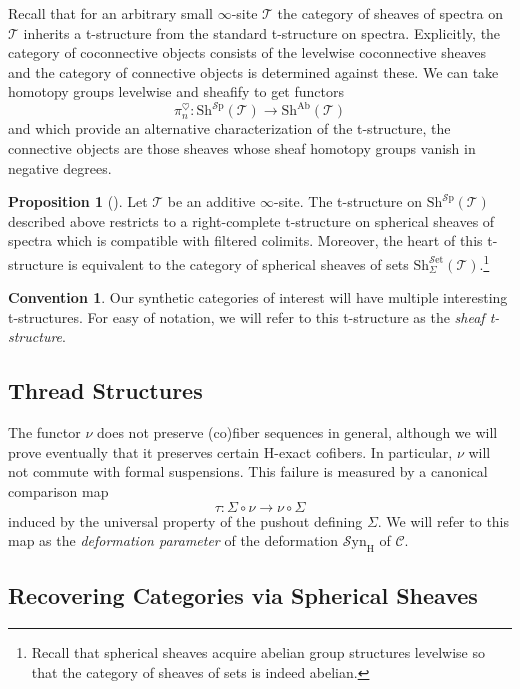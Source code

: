 \documentclass[10pt]{amsart}
\theoremstyle{definition}
\numberwithin{figure}{section}
\numberwithin{equation}{section}
\newtheorem{proposition}[figure]{Proposition}
\newtheorem{convention}[figure]{Convention}
\newcommand{\cC}{\mathcal{C}}
\newcommand{\cT}{\mathcal{T}}
\theoremstyle{cited}
\newcommand{\Ab}{\mathrm{Ab}}
\newcommand{\Sp}{{\mathcal{S}\mathrm{p}}}
\newcommand{\Set}{{\mathcal{S}\mathrm{et}}}
\newcommand{\Sh}{\mathrm{Sh}}
\newcommand{\Syn}{\mathcal{S}\mathrm{yn}}
\renewcommand{\H}{\mathrm{H}}
\begin{document}
Recall that for an arbitrary small $\infty$-site $\cT$ the category of sheaves of spectra on $\cT$ inherits a t-structure from the standard t-structure on spectra. Explicitly, the category of coconnective objects consists of the levelwise coconnective sheaves and the category of connective objects is determined against these. We can take homotopy groups levelwise and sheafify to get functors
\[
  \pi^\heartsuit_n:\Sh^\Sp(\cT)\to \Sh^\Ab(\cT)
\]
and which provide an alternative characterization of the t-structure, the connective objects are those sheaves whose sheaf homotopy groups vanish in negative degrees. 

\begin{proposition}[\cite{Pst22}]\label{lem:gentstructure}
  Let $\cT$ be an additive $\infty$-site. The t-structure on $\Sh^\Sp(\cT)$ described above restricts to a right-complete t-structure on spherical sheaves of spectra which is compatible with filtered colimits. Moreover, the heart of this t-structure is equivalent to the category of spherical sheaves of sets $\Sh_\Sigma^\Set(\cT)$.\footnote{Recall that spherical sheaves acquire abelian group structures levelwise so that the category of sheaves of sets is indeed abelian.}
\end{proposition}

\begin{convention}
  Our synthetic categories of interest will have multiple interesting t-structures. For easy of notation, we will refer to this t-structure as the \textit{sheaf t-structure}.
\end{convention}

\subsection{Thread Structures}

The functor $\nu$ does not preserve (co)fiber sequences in general, although we will prove eventually that it preserves certain $\H$-exact cofibers. In particular, $\nu$ will not commute with formal suspensions. This failure is measured by a canonical comparison map
\[
\tau: \Sigma \circ \nu \to \nu \circ \Sigma
\]
induced by the universal property of the pushout defining $\Sigma$. We will refer to this map as the \textit{deformation parameter} of the deformation $\Syn_\H$ of $\cC$. 

\subsection{Recovering Categories via Spherical Sheaves}
\end{document}
